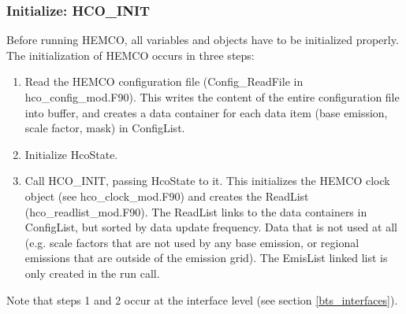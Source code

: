 \documentclass[12pt,a4paper]{article} %
\begin{document}
\subsubsection{Initialize: HCO\_INIT}
Before running HEMCO, all variables and objects have to be initialized properly. The initialization of HEMCO occurs in three steps:
\begin{enumerate}
\item Read the HEMCO configuration file (Config\_ReadFile in hco\_config\_mod.F90). This writes the content of the entire configuration file into buffer, and creates a data container for each data item (base emission, scale factor, mask) in ConfigList.
\item Initialize HcoState. 
\item Call HCO\_INIT, passing HcoState to it. This initializes the HEMCO clock object (see hco\_clock\_mod.F90) and creates the ReadList (hco\_readlist\_mod.F90). The ReadList links to the data containers in ConfigList, but sorted by data update frequency. Data that is not used at all (e.g. scale factors that are not used by any base emission, or regional emissions that are outside of the emission grid). The EmisList linked list is only created in the run call.
\end{enumerate}
Note that steps 1 and 2 occur at the interface level (see section \ref{bts_interfaces}).
\end{document}
